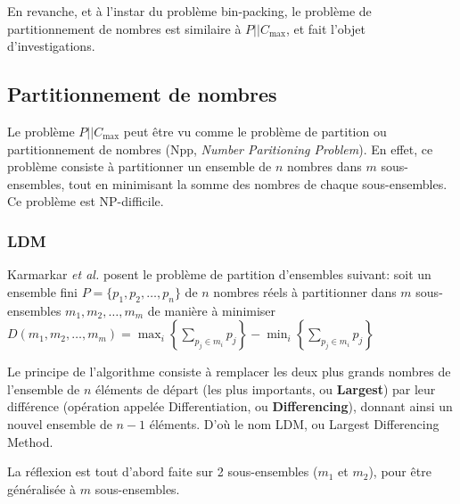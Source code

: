 \documentclass[a4paper,12pt]{report}
\theoremstyle{plain}				%
\theoremstyle{definition}				%
\newcommand\problemGrahamP{$P||C_{\max}$\xspace}
\begin{document}
En revanche, et à l'instar du problème bin-packing, le problème de
partitionnement de nombres est similaire à \problemGrahamP,
et fait l'objet d'investigations.

\subsection{Partitionnement de nombres}
\label{ssec:autresApprochesPartitionnement}

Le problème \problemGrahamP peut être vu comme le problème de
partition ou partitionnement de nombres (Npp, \emph{Number Paritioning
Problem}).
En effet, ce problème consiste à partitionner un ensemble de $n$ nombres
dans $m$ sous-ensembles, tout en minimisant la somme des nombres de
chaque sous-ensembles.
Ce problème est NP-difficile.

\subsubsection{LDM}


Karmarkar \emph{et al.}
\cite{karmarkar1982differencing} posent le problème de partition
d'ensembles suivant: soit un ensemble fini
$P=\{p_1, p_2, \ldots, p_n\}$ de $n$ nombres réels à partitionner dans $m$
sous-ensembles $m_1, m_2, \ldots, m_m$ de manière à minimiser
$D(m_1, m_2, \ldots, m_m) = \max_i \left\{ \sum_{p_j \in m_i}p_j
\right\} - \min_i \left\{ \sum_{p_j \in m_i}p_j \right\}$

Le principe de l'algorithme consiste à remplacer les deux plus grands
nombres de l'ensemble de $n$ éléments de départ (les plus importants, ou
\textbf{Largest}) par leur différence (opération appelée
Differentiation, ou \textbf{Differencing}), donnant ainsi un nouvel
ensemble de $n-1$ éléments.
D'où le nom LDM, ou Largest Differencing Method.


La réflexion est tout d'abord faite sur 2 sous-ensembles ($m_1$ et
$m_2$), pour être généralisée à $m$ sous-ensembles.
\end{document}

